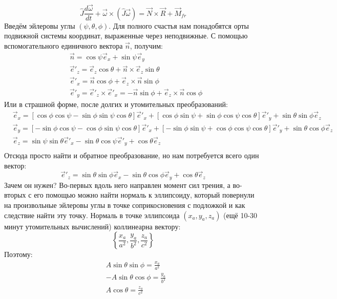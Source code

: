 \[
	\hat{J} \frac{d\vec{\omega}}{dt} + \vec{\omega}\times(\hat{J}\vec{\omega}) = \vec{N}\times\vec{R} + \vec{M}_{fr}
\]
Введём эйлеровы углы $(\psi, \theta, \phi)$. Для полного счастья нам понадобятся орты подвижной системы координат, выраженные через неподвижные. С помощью вспомогательного единичного вектора $\vec{n}$, получим:
\[
	\begin{aligned}
	& \vec{n} = \cos \psi \vec{e}_x + \sin \psi \vec{e}_y \\
	& \vec{e}'_z = \vec{e}_z \cos \theta  + \vec{n}\times\vec{e}_z \sin \theta \\
	& \vec{e}'_x = \vec{n} \cos \phi  + \vec{e}_z\times\vec{n} \sin \phi \\
	& \vec{e}'_y = \vec{e}'_z \times \vec{e}'_x = - \vec{n} \sin \phi + \vec{e}_z\times\vec{n} \cos \phi
	\end{aligned}
\]
Или в страшной форме, после долгих и утомительных преобразований:
\[
	\begin{aligned}
	& \vec{e}_x =
	[\cos \phi \cos \psi - \sin \phi \sin \psi \cos \theta] \vec{e}'_x +
	[\cos \phi \sin \psi + \sin \phi \cos \psi \cos \theta] \vec{e}'_y +
	\sin \theta \sin \phi \vec{e}_z \\
	& \vec{e}_y =
	[- \sin \phi \cos \psi - \cos \phi \sin \psi \cos \theta] \vec{e}'_x +
	[- \sin \phi \sin \psi + \cos \phi \cos \psi \cos \theta] \vec{e}'_y +
	\sin \theta \cos \phi \vec{e}_z \\
	& \vec{e}_z =
	\sin \psi \sin \theta \vec{e}'_x -
	\sin \theta \cos \psi \vec{e}'_y +
	\cos \theta \vec{e}_z \\
	\end{aligned}
\]
Отсюда просто найти и обратное преобразование, но нам потребуется всего один вектор:
\[
	\vec{e}'_z =
	\sin \theta \sin \phi \vec{e}_x -
	\sin \theta \cos \phi \vec{e}_y +
	\cos \theta \vec{e}_z
\]
Зачем он нужен? Во-первых вдоль него направлен момент сил трения, а во-вторых с его помощью можно найти нормаль к эллипсоиду, который повернули на произвольные эйлеровы углы в точке соприкосновения с подложкой и как следствие найти эту точку.
Нормаль в точке эллипсоида $(x_a, y_a, z_a)$ (ещё 10-30 минут утомительных вычислений) коллинеарна вектору:
\[
	\left\{
		\frac{x_a}{a^2},  \frac{y_a}{b^2}, \frac{z_a}{c^2}
	\right\}
\]
Поэтому:
\[
	\begin{aligned}
	& A\sin \theta \sin \phi  = \frac{x_a}{a^2} \\
	& -A\sin \theta \cos \phi  = \frac{y_a}{b^2} \\
	& A\cos \theta  = \frac{z_a}{c^2} \\
	\end{aligned}
\]
